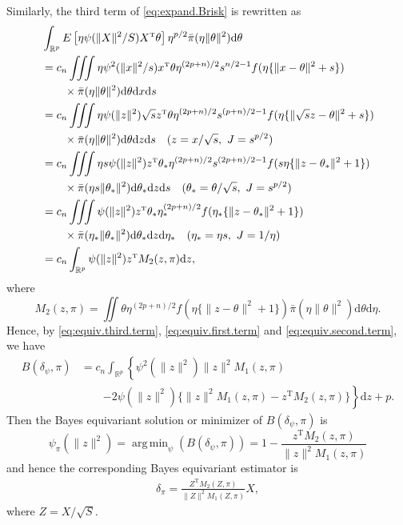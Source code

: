 \documentclass[preprint,11pt]{imsart}
\numberwithin{equation}{section}
\theoremstyle{plain}
\theoremstyle{definition}
\theoremstyle{remark}
\def\T{{ \mathrm{\scriptscriptstyle T} }}
\newcommand{\rd}{\mathrm{d}}
\DeclareMathOperator*{\argmin}{arg\,min}
\begin{document}
Similarly, the third term of \eqref{eq:expand.Brisk} is rewritten as
\begin{align}
 & \int_{\mathbb{R}^p} E\left[\eta\psi(\|X\|^2/S)X^\T\theta\right]\eta^{p/2}\bar{\pi}(\eta\|\theta\|^2) \rd \theta \label{eq:equiv.second.term}\\
 &= c_n\iiint \eta\psi^2(\|x\|^2/s)x^\T\theta
  \eta^{(2p+n)/2}s^{n/2-1}f(\eta\{\|x-\theta\|^2+s\}) \notag\\
&\qquad\times \bar{\pi}(\eta\|\theta\|^2) \rd \theta  \rd x  \rd s \notag\\
 &= c_n\iiint \eta \psi(\|z\|^2) \sqrt{s}z^\T\theta 
  \eta^{(2p+n)/2}s^{(p+n)/2-1}f(\eta\{\|\sqrt{s}z-\theta\|^2+s\}) \notag\\ &\qquad \times 
\bar{\pi}(\eta\|\theta\|^2) \rd \theta  \rd z  \rd s \quad (z=x/\sqrt{s}, \ J=s^{p/2})\notag\\
 &= c_n\iiint \eta s\psi(\|z\|^2) z^\T\theta_*
 \eta^{(2p+n)/2}s^{(2p+n)/2-1}f(s\eta\{\|z-\theta_*\|^2+1\}) \notag\\ &\qquad \times 
 \bar{\pi}(\eta s \|\theta_*\|^2) \rd \theta_*  \rd z  \rd s
 \quad (\theta_*=\theta/\sqrt{s}, \ J=s^{p/2})\notag\\
 &= c_n\iiint \psi(\|z\|^2)z^\T\theta_* 
  \eta_*^{(2p+n)/2}f(\eta_*\{\|z-\theta_*\|^2+1\})  \notag\\ &\qquad \times 
\bar{\pi}(\eta_*\|\theta_*\|^2) \rd \theta_*  \rd z  \rd \eta_* \quad (\eta_*=\eta s, \ J=1/\eta) \notag\\
 &= c_n\int_{\mathbb{R}^p} \psi(\|z\|^2)z^\T M_2(z,\pi) \rd z,\notag
\end{align}
where
\begin{equation}\label{eq:def:M_2}
 M_2(z,\pi)=
\iint \theta
  \eta^{(2p+n)/2} f(\eta\{\|z-\theta\|^2+1\}) \bar{\pi}(\eta\|\theta\|^2) \rd \theta  \rd \eta.
\end{equation}
Hence, by \eqref{eq:equiv.third.term}, \eqref{eq:equiv.first.term} and \eqref{eq:equiv.second.term},
 we have
\begin{equation}\label{eq:Bayesequivrisk}
 \begin{split}
 B(\delta_\psi, \pi) &=
 c_n\int_{\mathbb{R}^p} \left\{\psi^2(\|z\|^2) \|z\|^2 M_1(z,\pi) \right. \\
&\qquad \left. -2\psi(\|z\|^2)\{\|z\|^2 M_1(z,\pi)-z^\T M_2(z,\pi)\}\right\} \rd z +p. 
\end{split}
\end{equation}
Then the Bayes equivariant solution or minimizer of $ B(\delta_\psi, \pi)$ is
\begin{equation}\label{eq:eq_Bayes_sol}
 \psi_\pi(\|z\|^2)=\argmin_\psi\left(B(\delta_\psi, \pi)
 \right) 
 =1-\frac{z^\T M_2(z,\pi)}{\|z\|^2 M_1(z,\pi)}
\end{equation}
and hence the corresponding Bayes equivariant estimator is
\begin{align}\label{eq:delta_pi}
\delta_\pi= \frac{Z^\T M_2(Z,\pi)}{\|Z\|^2 M_1(Z,\pi)}X,
\end{align}
where $Z=X/\sqrt{S}$.
\end{document}
